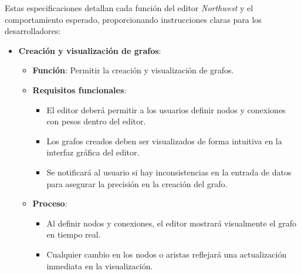 \documentclass[stu, 12pt, letterpaper, donotrepeattitle, floatsintext, natbib]{apa7}
\begin{document}
Estas especificaciones detallan cada función del editor \textit{Northwest} y el comportamiento esperado, proporcionando instrucciones claras para los desarrolladores:

\begin{itemize}
    \item \textbf{Creación y visualización de grafos}:
    \begin{itemize}
        \item \textbf{Función}: Permitir la creación y visualización de grafos.
        \item \textbf{Requisitos funcionales}:
            \begin{itemize}
                \item El editor deberá permitir a los usuarios definir nodos y conexiones con pesos dentro del editor.
                \item Los grafos creados deben ser visualizados de forma intuitiva en la interfaz gráfica del editor.
                \item Se notificará al usuario si hay inconsistencias en la entrada de datos para asegurar la precisión en la creación del grafo.
            \end{itemize}
        \item \textbf{Proceso}:
            \begin{itemize}
                \item Al definir nodos y conexiones, el editor mostrará visualmente el grafo en tiempo real.
                \item Cualquier cambio en los nodos o aristas reflejará una actualización inmediata en la visualización.
            \end{itemize}
    \end{itemize}


\end{itemize}
\end{document}

